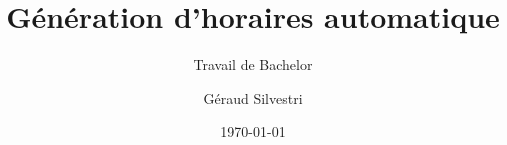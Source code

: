 \author{Géraud Silvestri}


\title{Génération d'horaires automatique}

\subtitle{Travail de Bachelor}


\date{\today}


